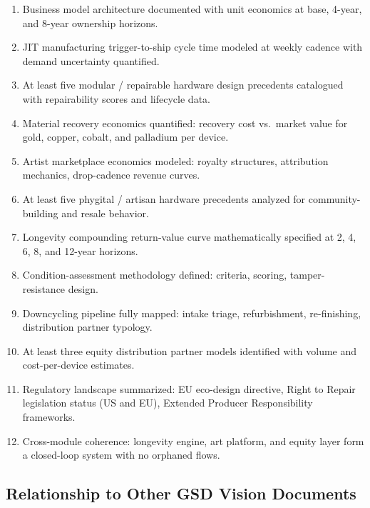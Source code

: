 \documentclass[11pt,letterpaper]{article}
\begin{document}
\begin{enumerate}
  \item Business model architecture documented with unit economics at base, 4-year, and 8-year ownership horizons.
  \item JIT manufacturing trigger-to-ship cycle time modeled at weekly cadence with demand uncertainty quantified.
  \item At least five modular / repairable hardware design precedents catalogued with repairability scores and lifecycle data.
  \item Material recovery economics quantified: recovery cost vs.\ market value for gold, copper, cobalt, and palladium per device.
  \item Artist marketplace economics modeled: royalty structures, attribution mechanics, drop-cadence revenue curves.
  \item At least five phygital / artisan hardware precedents analyzed for community-building and resale behavior.
  \item Longevity compounding return-value curve mathematically specified at 2, 4, 6, 8, and 12-year horizons.
  \item Condition-assessment methodology defined: criteria, scoring, tamper-resistance design.
  \item Downcycling pipeline fully mapped: intake triage, refurbishment, re-finishing, distribution partner typology.
  \item At least three equity distribution partner models identified with volume and cost-per-device estimates.
  \item Regulatory landscape summarized: EU eco-design directive, Right to Repair legislation status (US and EU), Extended Producer Responsibility frameworks.
  \item Cross-module coherence: longevity engine, art platform, and equity layer form a closed-loop system with no orphaned flows.
\end{enumerate}

\subsection{Relationship to Other GSD Vision Documents}
\end{document}
